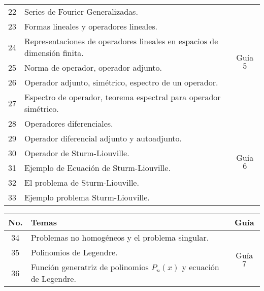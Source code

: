 \begin{table}[H]
\begin{tabular}{||c|p{13cm}||c||}
		\hline
			22 & Series de Fourier Generalizadas. & \multirow{6}{2cm}{Guía $5$} \\
			23 & Formas lineales y operadores lineales. & \\
			24 & Representaciones de operadores lineales en espacios de dimensión finita. & \\
			25 & Norma de operador, operador adjunto. & \\
			26 & Operador adjunto, simétrico, espectro de un operador. & \\
			27 & Espectro de operador, teorema espectral para operador simétrico. & \\
		\hline
			28 & Operadores diferenciales. & \multirow{6}{2cm}{Guía $6$} \\
			29 & Operador diferencial adjunto y autoadjunto. & \\
			30 & Operador de Sturm-Liouville. & \\
			31 & Ejemplo de Ecuación de Sturm-Liouville. & \\
			32 & El problema de Sturm-Liouville. & \\
			33 & Ejemplo problema Sturm-Liouville. & \\
		\hline
		\hline
	\end{tabular}
\end{table}



\begin{table}[H]
	\centering
	\begin{tabular}{||c|p{13cm}||c||}
		\hline
		\hline
			No. & Temas & Guía \\
		\hline
		\hline
			34 & Problemas no homogéneos y el problema singular. & \multirow{3}{2cm}{Guía $7$} \\
			35 & Polinomios de Legendre. & \\
			36 & Función generatriz de polinomios $P_n (x)$ y ecuación de Legendre. & \\
		\hline
		\hline
	\end{tabular}
\end{table}





